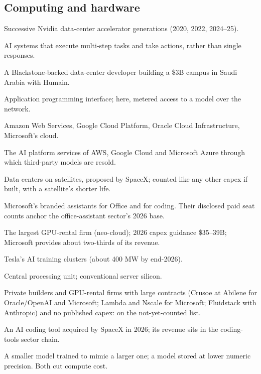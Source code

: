 \documentclass[11pt,letterpaper]{article}
\begin{document}
\subsection*{Computing and hardware}
\begin{description}\setlength{\itemsep}{1pt}
\item[A100; H100; B200] Successive Nvidia data-center accelerator generations (2020, 2022, 2024--25).
\item[Agentic; agents] AI systems that execute multi-step tasks and take actions, rather than single responses.
\item[AirTrunk] A Blackstone-backed data-center developer building a \$3B campus in Saudi Arabia with Humain.
\item[API] Application programming interface; here, metered access to a model over the network.
\item[AWS; GCP; OCI; Azure] Amazon Web Services, Google Cloud Platform, Oracle Cloud Infrastructure, Microsoft's cloud.
\item[Bedrock; Vertex; Azure AI Foundry] The AI platform services of AWS, Google Cloud and Microsoft Azure through which third-party models are resold.
\item[Compute in orbit] Data centers on satellites, proposed by SpaceX; counted like any other capex if built, with a satellite's shorter life.
\item[Copilot (Microsoft 365 Copilot; GitHub Copilot)] Microsoft's branded assistants for Office and for coding. Their disclosed paid seat counts anchor the office-assistant sector's 2026 base.
\item[CoreWeave] The largest GPU-rental firm (neo-cloud); 2026 capex guidance \$35--39B; Microsoft provides about two-thirds of its revenue.
\item[Cortex] Tesla's AI training clusters (about 400 MW by end-2026).
\item[CPU] Central processing unit; conventional server silicon.
\item[Crusoe; Lambda; Nscale; Fluidstack] Private builders and GPU-rental firms with large contracts (Crusoe at Abilene for Oracle/OpenAI and Microsoft; Lambda and Nscale for Microsoft; Fluidstack with Anthropic) and no published capex: on the not-yet-counted list.
\item[Cursor] An AI coding tool acquired by SpaceX in 2026; its revenue sits in the coding-tools sector chain.
\item[Distilled / quantized model] A smaller model trained to mimic a larger one; a model stored at lower numeric precision. Both cut compute cost.

\end{description}
\end{document}
